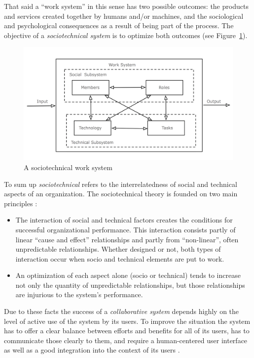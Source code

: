 That said a ``work system'' in this sense has two possible outcomes: the products and services created together by humans and/or machines, and the sociological and psychological consequences as a result of being part of the process. The objective of a \emph{sociotechnical system} is to optimize both outcomes (see Figure~\ref{fig:images_sociotechnical_system}). \@

\begin{figure}[H]
  \centering
  \includegraphics[width=0.9\columnwidth]{images/sociotechnical_system.png}
  \caption[A sociotechnical work system]{A sociotechnical work system \citep[pg. 29]{sydow1985}}
\label{fig:images_sociotechnical_system}
\end{figure}

To sum up \emph{sociotechnical} refers to the interrelatedness of social and technical aspects of an organization. The sociotechnical theory is founded on two main principles \citep{Koch2008}: \@

\begin{itemize}
  \item The interaction of social and technical factors creates the conditions for successful organizational performance. This interaction consists partly of linear ``cause and effect'' relationships and partly from ``non-linear'', often unpredictable relationships. Whether designed or not, both types of interaction occur when socio and technical elements are put to work.
  \item An optimization of each aspect alone (socio or technical) tends to increase not only the quantity of unpredictable relationships, but those relationships are injurious to the system's performance.
\end{itemize}

Due to these facts the success of a \emph{collaborative system} depends highly on the level of active use of the system by its users. To improve the situation the system has to offer a clear balance between efforts and benefits for all of its users, has to communicate those clearly to them, and require a human-centered user interface as well as a good integration into the context of its users \citep{Koch2008}.

